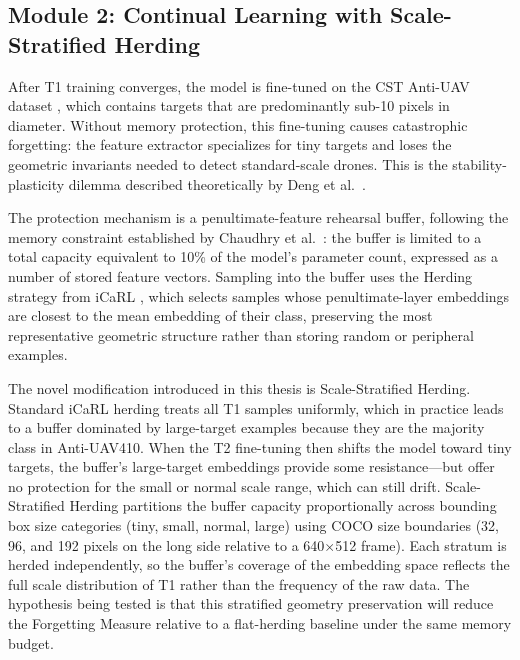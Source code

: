 \subsection{Module 2: Continual Learning with Scale-Stratified Herding}
\label{sec:cl}

After T1 training converges, the model is fine-tuned on the CST Anti-UAV dataset \cite{xie2025cstantiuavthermalinfrared}, which contains targets that are predominantly sub-10 pixels in diameter. Without memory protection, this fine-tuning causes catastrophic forgetting: the feature extractor specializes for tiny targets and loses the geometric invariants needed to detect standard-scale drones. This is the stability-plasticity dilemma described theoretically by Deng et al.\ \cite{deng_unlocking_2025}.

The protection mechanism is a penultimate-feature rehearsal buffer, following the memory constraint established by Chaudhry et al.\ \cite{chaudhry2019tiny}: the buffer is limited to a total capacity equivalent to 10\% of the model's parameter count, expressed as a number of stored feature vectors. Sampling into the buffer uses the Herding strategy from iCaRL \cite{rebuffi2017icarl}, which selects samples whose penultimate-layer embeddings are closest to the mean embedding of their class, preserving the most representative geometric structure rather than storing random or peripheral examples.

The novel modification introduced in this thesis is Scale-Stratified Herding. Standard iCaRL herding treats all T1 samples uniformly, which in practice leads to a buffer dominated by large-target examples because they are the majority class in Anti-UAV410. When the T2 fine-tuning then shifts the model toward tiny targets, the buffer's large-target embeddings provide some resistance---but offer no protection for the small or normal scale range, which can still drift. Scale-Stratified Herding partitions the buffer capacity proportionally across bounding box size categories (tiny, small, normal, large) using COCO size boundaries (32, 96, and 192 pixels on the long side relative to a 640$\times$512 frame). Each stratum is herded independently, so the buffer's coverage of the embedding space reflects the full scale distribution of T1 rather than the frequency of the raw data. The hypothesis being tested is that this stratified geometry preservation will reduce the Forgetting Measure relative to a flat-herding baseline under the same memory budget.

